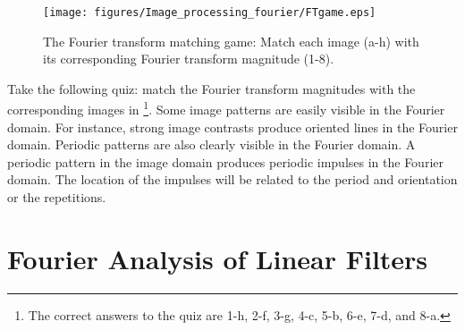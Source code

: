 %
%
%
%
%
%
%
%
%
%

\begin{figure}[H]
\centerline{
\texttt{[image: figures/Image\_processing\_fourier/FTgame.eps]}}
\caption{The Fourier transform matching game: Match each image (a-h) with its corresponding Fourier transform magnitude (1-8).}
\label{fig:quiz}
\end{figure}


Take the following quiz: match the Fourier transform magnitudes with the corresponding images in \fig{\ref{fig:quiz}}\footnote{The correct answers to the quiz \fig{\ref{fig:quiz}} are 1-h, 2-f, 3-g, 4-c, 5-b, 6-e, 7-d, and 8-a.}. Some image patterns are easily visible in the Fourier domain. For instance, strong image contrasts produce oriented lines in the Fourier domain. Periodic patterns are also clearly visible in the Fourier domain. A periodic pattern in the image domain produces periodic impulses in the Fourier domain. The location of the impulses will be related to the period and orientation or the repetitions. 






\section{Fourier Analysis of Linear Filters}
\label{sect:transfer_function}

